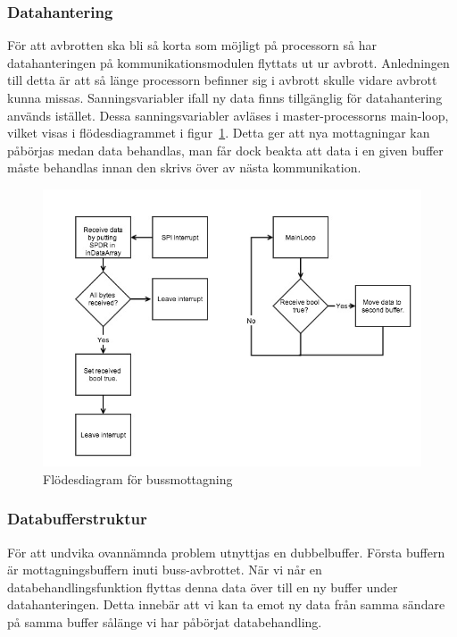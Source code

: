 ﻿\documentclass[a4paper,12pt,fleqn]{article}
\begin{document}
\subsubsection{Datahantering}
För att avbrotten ska bli så korta som möjligt på processorn så har datahanteringen på kommunikationsmodulen flyttats ut ur avbrott. Anledningen till detta är att så länge processorn befinner sig i avbrott skulle vidare avbrott kunna missas. Sanningsvariabler ifall ny data finns tillgänglig för datahantering används istället. Dessa sanningsvariabler avläses i master-processorns main-loop, vilket visas i flödesdiagrammet i figur~\ref{fig:SPIrec}. Detta ger att nya mottagningar kan påbörjas medan data behandlas, man får dock beakta att data i en given buffer måste behandlas innan den skrivs över av nästa kommunikation.

\begin{figure}[htp] %
  \begin{center}
  \includegraphics[keepaspectratio=true,scale=0.5]{spirec.jpg}  %
  \end{center}
  \caption{Flödesdiagram för bussmottagning} %
  \label{fig:SPIrec}
\end{figure}


\subsubsection{Databufferstruktur}
För att undvika ovannämnda problem utnyttjas en dubbelbuffer. Första buffern är mottagningsbuffern inuti buss-avbrottet. När vi når en databehandlingsfunktion flyttas denna data över till en ny buffer under datahanteringen. Detta innebär att vi kan ta emot ny data från samma sändare på samma buffer sålänge vi har påbörjat databehandling.
\end{document}
